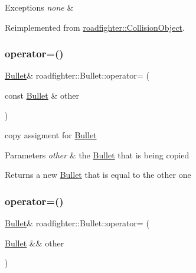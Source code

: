 \begin{DoxyExceptions}{Exceptions}
{\em none} & \\
\hline
\end{DoxyExceptions}


Reimplemented from \hyperlink{classroadfighter_1_1CollisionObject_a738071cd7b1b8cd4c8d455b5e552bd4c}{roadfighter\+::\+Collision\+Object}.

\mbox{\label{classroadfighter_1_1Bullet_ab507000db2f726b8906ced3ea4c7782f}} 
\subsubsection{\texorpdfstring{operator=()}{operator=()}\hspace{0.1cm}{\footnotesize\ttfamily [1/2]}}
{\footnotesize\ttfamily \hyperlink{classroadfighter_1_1Bullet}{Bullet}\& roadfighter\+::\+Bullet\+::operator= (\begin{DoxyParamCaption}\item[{const \hyperlink{classroadfighter_1_1Bullet}{Bullet} \&}]{other }\end{DoxyParamCaption})\hspace{0.3cm}{\ttfamily [default]}}

copy assigment for \hyperlink{classroadfighter_1_1Bullet}{Bullet} 
\begin{DoxyParams}{Parameters}
{\em other} & the \hyperlink{classroadfighter_1_1Bullet}{Bullet} that is being copied \\
\hline
\end{DoxyParams}
\begin{DoxyReturn}{Returns}
a new \hyperlink{classroadfighter_1_1Bullet}{Bullet} that is equal to the other one 
\end{DoxyReturn}
\mbox{\label{classroadfighter_1_1Bullet_a7c63a2a326738605af30ad850272d3b7}} 
\subsubsection{\texorpdfstring{operator=()}{operator=()}\hspace{0.1cm}{\footnotesize\ttfamily [2/2]}}
{\footnotesize\ttfamily \hyperlink{classroadfighter_1_1Bullet}{Bullet}\& roadfighter\+::\+Bullet\+::operator= (\begin{DoxyParamCaption}\item[{\hyperlink{classroadfighter_1_1Bullet}{Bullet} \&\&}]{other }\end{DoxyParamCaption})\hspace{0.3cm}{\ttfamily [default]}}

